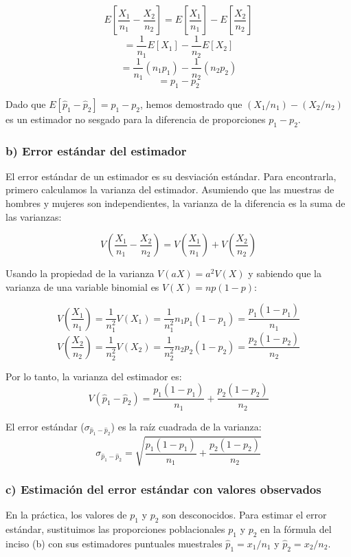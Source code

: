 \documentclass[12pt]{article}
\begin{document}
$$ E\left[ \frac{X_1}{n_1} - \frac{X_2}{n_2} \right] = E\left[ \frac{X_1}{n_1} \right] - E\left[ \frac{X_2}{n_2} \right] $$
$$ = \frac{1}{n_1} E[X_1] - \frac{1}{n_2} E[X_2] $$
$$ = \frac{1}{n_1} (n_1 p_1) - \frac{1}{n_2} (n_2 p_2) $$
$$ = p_1 - p_2 $$

Dado que $E[\hat{p}_1 - \hat{p}_2] = p_1 - p_2$, hemos demostrado que $(X_1/n_1) - (X_2/n_2)$ es un estimador no sesgado para la diferencia de proporciones $p_1 - p_2$.

\subsubsection*{b) Error estándar del estimador}

El error estándar de un estimador es su desviación estándar. Para encontrarla, primero calculamos la varianza del estimador. Asumiendo que las muestras de hombres y mujeres son independientes, la varianza de la diferencia es la suma de las varianzas:

$$ V\left( \frac{X_1}{n_1} - \frac{X_2}{n_2} \right) = V\left( \frac{X_1}{n_1} \right) + V\left( \frac{X_2}{n_2} \right) $$

Usando la propiedad de la varianza $V(aX) = a^2 V(X)$ y sabiendo que la varianza de una variable binomial es $V(X) = np(1-p)$:

$$ V\left( \frac{X_1}{n_1} \right) = \frac{1}{n_1^2} V(X_1) = \frac{1}{n_1^2} n_1 p_1 (1 - p_1) = \frac{p_1 (1 - p_1)}{n_1} $$
$$ V\left( \frac{X_2}{n_2} \right) = \frac{1}{n_2^2} V(X_2) = \frac{1}{n_2^2} n_2 p_2 (1 - p_2) = \frac{p_2 (1 - p_2)}{n_2} $$

Por lo tanto, la varianza del estimador es:
$$ V(\hat{p}_1 - \hat{p}_2) = \frac{p_1 (1 - p_1)}{n_1} + \frac{p_2 (1 - p_2)}{n_2} $$

El error estándar ($\sigma_{\hat{p}_1 - \hat{p}_2}$) es la raíz cuadrada de la varianza:
$$ \sigma_{\hat{p}_1 - \hat{p}_2} = \sqrt{\frac{p_1 (1 - p_1)}{n_1} + \frac{p_2 (1 - p_2)}{n_2}} $$

\subsubsection*{c) Estimación del error estándar con valores observados}

En la práctica, los valores de $p_1$ y $p_2$ son desconocidos. Para estimar el error estándar, sustituimos las proporciones poblacionales $p_1$ y $p_2$ en la fórmula del inciso (b) con sus estimadores puntuales muestrales $\hat{p}_1 = x_1/n_1$ y $\hat{p}_2 = x_2/n_2$.
\end{document}
